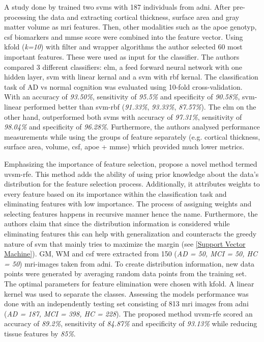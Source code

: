 A study done by \textcite{khatriEfficientCombinationSMRI2020a} trained two \gls{svm}s with 187 individuals from \gls{adni}. After pre-processing the data and extracting cortical thickness, surface area and gray matter volume as \gls{mri} features. Then, other modalities such as the \gls{apoe} genotyp, \gls{csf} biomarkers and \gls{mmse} score were combined into the feature vector. Using \gls{kfold} (\textit{k=10}) with filter and wrapper algorithms the author selected 60 most important features. These were used as input for the classifier. The authors compared 3 different classifiers:  \gls{elm}, a feed forward neural network with one hidden layer, \gls{svm} with linear kernal and a \gls{svm} with \gls{rbf} kernal. The classification task of \gls{AD} vs normal cognition was evaluated using 10-fold cross-validation. With an accuracy of \textit{93.50\%}, sensitivity of \textit{95.5\%} and specificity of \textit{90.58\%}, \gls{svm}-linear performed better than \gls{svm}-\gls{rbf} (\textit{91.33\%}, \textit{93.33\%}, \textit{87.57\%}). The \gls{elm} on the other hand, outperformed both \gls{svm}s with accuracy of \textit{97.31\%}, sensitivity of \textit{98.04\%} and specificity of \textit{96.28\%}. Furthermore, the authors analysed performance measurements while using the groups of feature separately (e.g. cortical thickness, surface area, volume, \gls{csf}, \gls{apoe} + \gls{mmse}) which provided much lower metrics.  




Emphasizing the importance of feature selection, \textcite{richhariyaDiagnosisAlzheimerDisease2020} propose a novel method termed \gls{uvsm-rfe}. This method adds the ability of using prior knowledge about the data's distribution for the feature selection process. Additionally, it attributes weights to every feature based on its importance within the classification task and eliminating features with low importance. The process of assigning weights and selecting features happens in recursive manner hence the name. Furthermore, the authors claim that since the distribution information is considered while eliminating features this can help with generalization and counteracts the greedy nature of \gls{svm} that mainly tries to maximize the margin (see \ref{Support Vector Machine}). GM, WM and \gls{csf} were extracted from 150 (\textit{AD = 50, MCI = 50, HC = 50}) \gls{mri}-images taken from \gls{adni}. To create distribution information, new data points were generated by averaging random data points from the training set. The optimal parameters for feature elimination were chosen with \gls{kfold}. A linear kernel was used to separate the classes. Assessing the models performance was done with an independently testing set consisting of 813 \gls{mri} images from \gls{adni} (\textit{AD = 187, MCI = 398, HC = 228}). The proposed method \gls{uvsm-rfe} scored an accuracy of \textit{89.2\%}, sensitivity of \textit{84.87\%} and specificity of \textit{93.13\%} while reducing tissue features by \textit{85\%}. 

